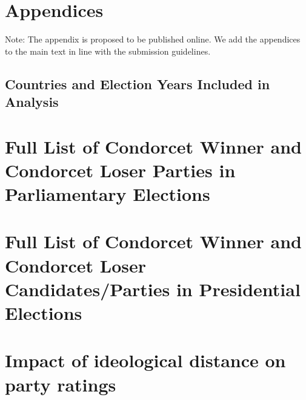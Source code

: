 \documentclass[12pt]{scrartcl}
\begin{document}
\newpage 
\singlespacing
%


%

\appendix
\section*{Appendices}

Note: The appendix is  proposed to be published online. We add the appendices to the main text in line with the submission guidelines. 

\singlespacing
\newpage
\begin{landscape}
\section{Countries and Election Years Included in Analysis}

\end{landscape}
	
\section{Full List of Condorcet Winner and Condorcet Loser Parties in Parliamentary Elections}
%	
	
\newpage
\section{Full List of Condorcet Winner and Condorcet Loser Candidates/Parties in Presidential Elections}

%

\newpage
\section{Impact of ideological distance on party ratings}\label{app.IdeolDist}

\renewcommand{\thetable}{D} 


\end{document}
